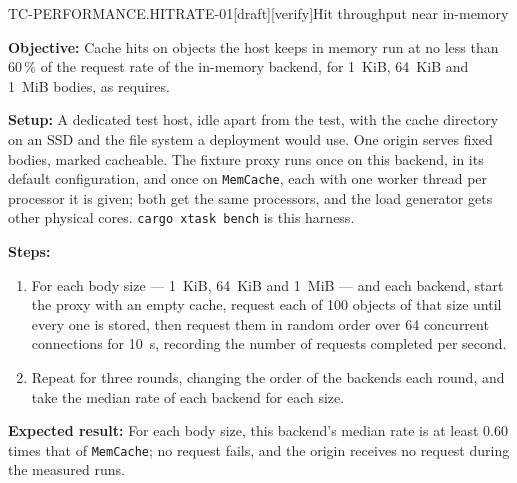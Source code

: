 \begin{requirement}{TC-PERFORMANCE.HITRATE-01}[draft][verify]{Hit throughput near in-memory}


  \textbf{Objective:} Cache hits on objects the host keeps in memory run at
  no less than 60\,\% of the request rate of the in-memory backend, for 1~KiB,
  64~KiB and 1~MiB bodies, as  requires.

  \textbf{Setup:} A dedicated test host, idle apart from the test, with the
  cache directory on an SSD and the file system a deployment would use. One
  origin serves fixed bodies, marked cacheable. The fixture proxy runs once on
  this backend, in its default configuration, and once on \texttt{MemCache},
  each with one worker thread per processor it is given; both get the same
  processors, and the load generator gets other physical cores.
  \texttt{cargo xtask bench} is this harness.

  \textbf{Steps:}
  \begin{enumerate}
    \item For each body size --- 1~KiB, 64~KiB and 1~MiB --- and each
      backend, start the proxy with an empty cache, request each of 100
      objects of that size until every one is stored, then request them in
      random order over 64 concurrent connections for 10~s, recording the
      number of requests completed per second.
    \item Repeat for three rounds, changing the order of the backends each
      round, and take the median rate of each backend for each size.
  \end{enumerate}

  \textbf{Expected result:} For each body size, this backend's median rate is
  at least 0.60 times that of \texttt{MemCache}; no request fails, and the
  origin receives no request during the measured runs.



\end{requirement}

